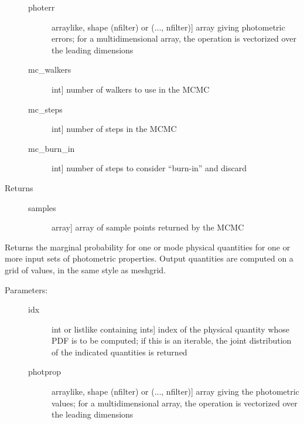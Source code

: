 \documentclass[letterpaper,10pt,english]{sphinxmanual}
\begin{document}
\begin{fulllineitems}
\begin{fulllineitems}
\begin{description}
\begin{description}
\item[{photerr}] \leavevmode{[}arraylike, shape (nfilter) or (..., nfilter){]}
array giving photometric errors; for a multidimensional
array, the operation is vectorized over the leading
dimensions

\item[{mc\_walkers}] \leavevmode{[}int{]}
number of walkers to use in the MCMC

\item[{mc\_steps}] \leavevmode{[}int{]}
number of steps in the MCMC

\item[{mc\_burn\_in}] \leavevmode{[}int{]}
number of steps to consider ``burn-in'' and discard

\end{description}

\item[{Returns}] \leavevmode\begin{description}
\item[{samples}] \leavevmode{[}array{]}
array of sample points returned by the MCMC

\end{description}

\end{description}

\end{fulllineitems}


\begin{fulllineitems}
\label{bayesphot:slugpy.bayesphot.bp.bp.mpdf}
Returns the marginal probability for one or mode physical
quantities for one or more input sets of photometric
properties. Output quantities are computed on a grid of
values, in the same style as meshgrid.
\begin{description}
\item[{Parameters:}] \leavevmode\begin{description}
\item[{idx}] \leavevmode{[}int or listlike containing ints{]}
index of the physical quantity whose PDF is to be
computed; if this is an iterable, the joint distribution of
the indicated quantities is returned

\item[{photprop}] \leavevmode{[}arraylike, shape (nfilter) or (..., nfilter){]}
array giving the photometric values; for a
multidimensional array, the operation is vectorized over
the leading dimensions


\end{description}
\end{description}
\end{fulllineitems}
\end{fulllineitems}
\end{document}
